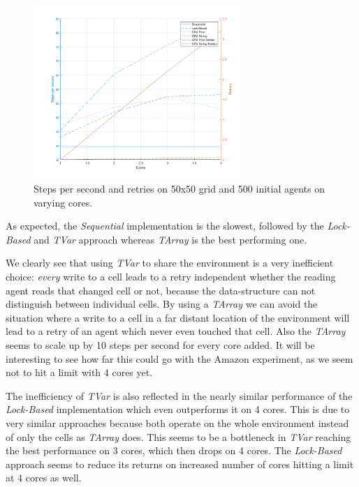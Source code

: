 \begin{figure}
	\centering
	\includegraphics[width=0.7\textwidth, angle=0]{./fig/concurrentabs/sugarscape/varying_cores.png}
	\caption{Steps per second and retries on 50x50 grid and 500 initial agents on varying cores.}
	\label{fig:varying_cores}
\end{figure}

As expected, the \textit{Sequential} implementation is the slowest, followed by the \textit{Lock-Based} and \textit{TVar} approach whereas \textit{TArray} is the best performing one.

We clearly see that using \textit{TVar} to share the environment is a very inefficient choice: \textit{every} write to a cell leads to a retry independent whether the reading agent reads that changed cell or not, because the data-structure can not distinguish between individual cells. By using a \textit{TArray} we can avoid the situation where a write to a cell in a far distant location of the environment will lead to a retry of an agent which never even touched that cell. Also the \textit{TArray} seems to scale up by 10 steps per second for every core added. It will be interesting to see how far this could go with the Amazon experiment, as we seem not to hit a limit with 4 cores yet.

The inefficiency of \textit{TVar} is also reflected in the nearly similar performance of the \textit{Lock-Based} implementation which even outperforms it on 4 cores. This is due to very similar approaches because both operate on the whole environment instead of only the cells as \textit{TArray} does. This seems to be a bottleneck in \textit{TVar} reaching the best performance on 3 cores, which then drops on 4 cores. The \textit{Lock-Based} approach seems to reduce its returns on increased number of cores hitting a limit at 4 cores as well.

